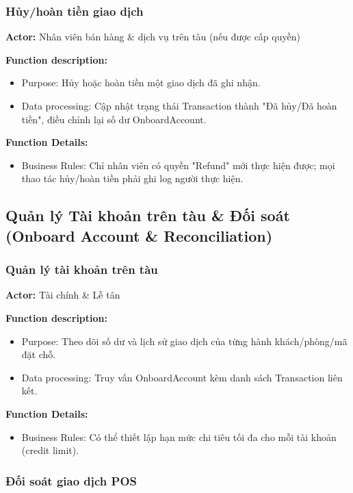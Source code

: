 \subsubsection{Hủy/hoàn tiền giao dịch}
\textbf{Actor:} Nhân viên bán hàng \& dịch vụ trên tàu (nếu được cấp
quyền)

\textbf{Function description:}
\begin{itemize}
    \item Purpose: Hủy hoặc hoàn tiền một giao dịch đã ghi nhận.
    \item Data processing: Cập nhật trạng thái Transaction thành "Đã
    hủy/Đã hoàn tiền", điều chỉnh lại số dư OnboardAccount.
\end{itemize}

\textbf{Function Details:}
\begin{itemize}
    \item Business Rules: Chỉ nhân viên có quyền "Refund" mới thực hiện
    được; mọi thao tác hủy/hoàn tiền phải ghi log người thực hiện.
\end{itemize}



\subsection{Quản lý Tài khoản trên tàu \& Đối soát (Onboard Account \& Reconciliation)}

\subsubsection{Quản lý tài khoản trên tàu}

\noindent\textbf{Actor:} Tài chính \& Lễ tân

\noindent\textbf{Function description:}
\begin{itemize}
    \item Purpose: Theo dõi số dư và lịch sử giao dịch của từng hành khách/phòng/mã đặt chỗ.
    \item Data processing: Truy vấn OnboardAccount kèm danh sách Transaction liên kết.
\end{itemize}

\noindent\textbf{Function Details:}
\begin{itemize}
    \item Business Rules: Có thể thiết lập hạn mức chi tiêu tối đa cho mỗi tài khoản (credit limit).
\end{itemize}

\subsubsection{Đối soát giao dịch POS}


